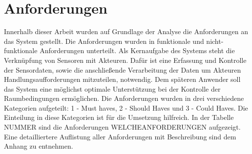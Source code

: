 \section{Anforderungen}
Innerhalb dieser Arbeit wurden auf Grundlage der Analyse die Anforderungen an das System gestellt. Die Anforderungen wurden in funktionale und nicht-funktionale Anforderungen unterteilt. Als Kernaufgabe des Systems steht die Verknüpfung von Sensoren mit Akteuren. Dafür ist eine Erfassung und Kontrolle der Sensordaten, sowie die anschließende Verarbeitung der Daten um Akteuren Handlungsaufforderungen mitzuteilen, notwendig. Dem späteren Anwender soll das System eine möglichst optimale Unterstützung bei der Kontrolle der Raumbedingungen ermöglichen. Die Anforderungen wurden in drei verschiedene Kategorien aufgeteilt: 1 - Must haves, 2 - Should Haves und 3 - Could Haves. Die Einteilung in diese Kategorien ist für die Umsetzung hilfreich. In der Tabelle NUMMER sind die Anforderungen WELCHEANFORDERUNGEN aufgezeigt. Eine detailliertere Auflistung aller Anforderungen mit Beschreibung sind dem Anhang zu entnehmen.\\


